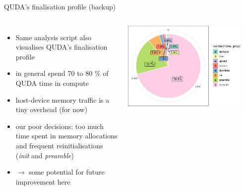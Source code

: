 \documentclass[xcolor={dvipsnames,table}]{beamer}
\begin{document}
\begin{frame}{QUDA's finalisation profile (backup)}
  \begin{columns}
      \begin{itemize}
        \item Same analysis script also visualises QUDA's finalisation profile 
        \vspace{0.2cm}
        \item in general spend 70 to 80 \% of QUDA time in compute
        \vspace{0.2cm}
        \item host-device memory traffic is a tiny overhead (for now)
        \vspace{0.2cm}
        \item our poor decisions: too much time spent in memory allocations and frequent reinitialisations (\textit{init} and \textit{preamble})
        \vspace{0.2cm}
        \item $\rightarrow$ some potential for future improvement here
      \end{itemize}
      \vspace{0.1cm}
      \centering
      \includegraphics[width=0.89\textwidth]{quda_profile}
  \end{columns}
\end{frame}

\backupend
\end{document}
